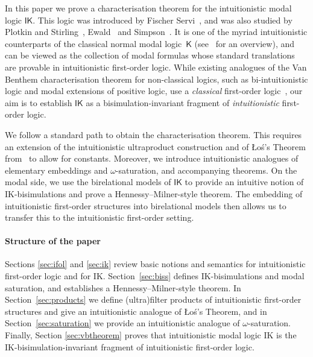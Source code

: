 \documentclass[submission,copyright,creativecommons]{eptcs}
\newcommand{\IK}{\mathsf{IK}}
\begin{document}
In this paper we prove a characterisation theorem for the intuitionistic modal logic $\IK$. This logic was introduced by Fischer Servi~\cite{Servi84}, and was also studied by Plotkin and Stirling~\cite{PltStir86}, Ewald~\cite{Ewa86} and Simpson~\cite{Sim94}. It is one of the myriad intuitionistic counterparts of the classical normal modal logic~$\mathsf{K}$ (see~\cite{Sim94} for an overview), and can be viewed as the collection of modal formulas whose standard translations are provable in intuitionistic first-order logic.
%
While existing analogues of the Van Benthem characterisation theorem for non-classical logics, such as bi-intuitionistic logic and modal extensions of positive logic, use a \emph{classical} first-order logic~\cite{KurRij97,Bad16,GroMarSte25}, our aim is to establish $\IK$ as a bisimulation-invariant fragment of \emph{intuitionistic} first-order logic.

We follow a standard path to obtain the characterisation theorem. This requires an extension of the intuitionistic ultraproduct construction and of \L{}o{\'s}'s Theorem from~\cite{Gab72,Mar79} to allow for constants. Moreover, we introduce intuitionistic analogues of elementary embeddings and $\omega$-saturation, and accompanying theorems.
%
On the modal side, we use the birelational models of $\IK$ to provide an intuitive notion of IK-bi\-si\-mu\-la\-tions and prove a Hennessy--Milner-style theorem. The embedding of intuitionistic first-order structures into birelational models then allows us to transfer this to the intuitionistic first-order setting.





\paragraph{Structure of the paper}
  Sections \ref{sec:ifol} and \ref{sec:ik} review basic notions and semantics for intuitionistic first-order logic and for IK.
%
Section~\ref{sec:biss} defines IK-bi\-si\-mu\-la\-tions and modal saturation,
  and establishes a Hennessy--Milner-style theorem.
%
  In Section~\ref{sec:products} we define (ultra)filter products of intuitionistic first-order structures and give an intuitionistic analogue of {\L}o{\'s}'s Theorem,
%
  and in Section~\ref{sec:saturation} we provide an intuitionistic
  analogue of $\omega$-saturation.
%
Finally, Section \ref{sec:vbtheorem} proves that intuitionistic modal logic IK is the IK-bi\-si\-mu\-la\-tion-invariant fragment of intuitionistic first-order logic.
\end{document}

